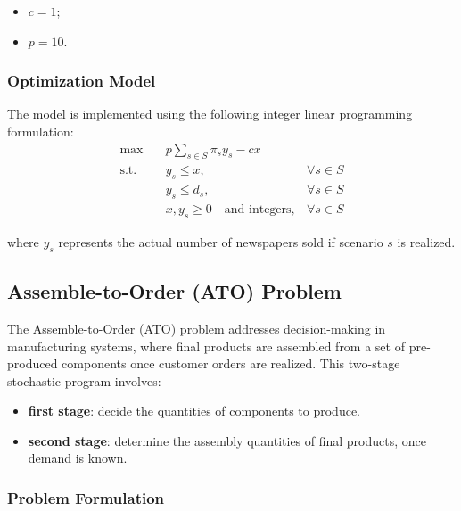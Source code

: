 \documentclass[a4paper,12pt]{article}
\begin{document}
	\begin{itemize}
		\item \( c = 1 \);
		\item \( p = 10 \).
	\end{itemize}
	
	\subsubsection{Optimization Model}
	
	The model is implemented using the following integer linear programming formulation:
	\[
	\begin{aligned}
		\max & \quad p \sum_{s \in S} \pi_s y_s - c x \\
		\text{s.t.} & \quad y_s \leq x, & \forall s \in S \\
		& \quad y_s \leq d_s, & \forall s \in S \\
		& \quad x, y_s \geq 0 \quad \text{and integers}, & \forall s \in S
	\end{aligned}
	\]
	
\noindent	where \( y_s \) represents the actual number of newspapers sold if scenario \( s \) is realized.
	
	\subsection{Assemble-to-Order (ATO) Problem}
	
	The Assemble-to-Order (ATO) problem addresses decision-making in manufacturing systems, where final products are assembled from a set of pre-produced components once customer orders are realized. This two-stage stochastic program involves:
	\begin{itemize}
		\item \textbf{first stage}: decide the quantities of components to produce.
		\item \textbf{second stage}: determine the assembly quantities of final products, once demand is known.
	\end{itemize}
	
	\subsubsection{Problem Formulation}
	
\end{document}
